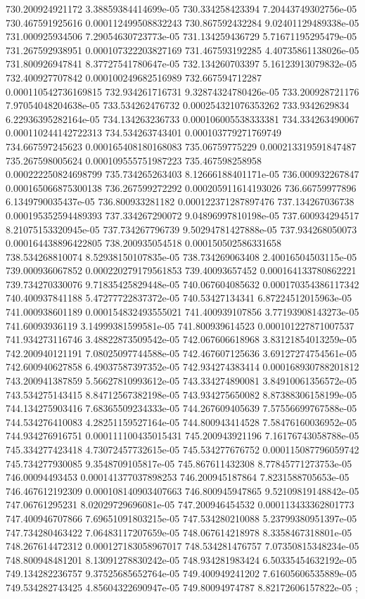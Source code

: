 {730.200924921172 3.38859384414699e-05
730.334258423394 7.20443749302756e-05
730.467591925616 0.000112499508832243
730.867592432284 9.02401129489338e-05
731.000925934506 7.29054630723773e-05
731.134259436729 5.71671195295479e-05
731.267592938951 0.000107322203827169
731.467593192285 4.40735861138026e-05
731.800926947841 8.37727541780647e-05
732.134260703397 5.16123913079832e-05
732.400927707842 0.000100249682516989
732.667594712287 0.000110542736169815
732.934261716731 9.32874324780426e-05
733.200928721176 7.97054048204638e-05
733.534262476732 0.000254321076353262
733.9342629834 6.22936395282164e-05
734.134263236733 0.000106005538333381
734.334263490067 0.000110244142722313
734.534263743401 0.000103779271769749
734.667597245623 0.000165408180168083
735.06759775229 0.000213319591847487
735.267598005624 0.000109555751987223
735.467598258958 0.000222250824698799
735.734265263403 8.12666188401171e-05
736.000932267847 0.000165066875300138
736.267599272292 0.000205911614193026
736.66759977896 6.1349790035437e-05
736.800933281182 0.000122371287897476
737.134267036738 0.000195352594489393
737.334267290072 9.04896997810198e-05
737.600934294517 8.21075153320945e-05
737.734267796739 9.50294781427888e-05
737.934268050073 0.000164438896422805
738.200935054518 0.000150502586331658
738.534268810074 8.52938150107835e-05
738.734269063408 2.40016504503115e-05
739.000936067852 0.000220279179561853
739.40093657452 0.000164133780862221
739.734270330076 9.71835425829448e-05
740.067604085632 0.000170354386117342
740.400937841188 5.47277722837372e-05
740.53427134341 6.87224512015963e-05
741.000938601189 0.000154832493555021
741.400939107856 3.77193908143273e-05
741.60093936119 3.14999381599581e-05
741.800939614523 0.000101227871007537
741.934273116746 3.48822873509542e-05
742.067606618968 3.83121854013259e-05
742.200940121191 7.08025097744588e-05
742.467607125636 3.69127274754561e-05
742.600940627858 6.49037587397352e-05
742.934274383414 0.000168930788201812
743.200941387859 5.56627810993612e-05
743.334274890081 3.84910061356572e-05
743.534275143415 8.84712567382198e-05
743.934275650082 8.87388306158199e-05
744.134275903416 7.68365509234333e-05
744.267609405639 7.57556699767588e-05
744.534276410083 4.28251159527164e-05
744.800943414528 7.58476160036952e-05
744.934276916751 0.000111100435015431
745.200943921196 7.16176743058788e-05
745.334277423418 4.73072457732615e-05
745.534277676752 0.000115087796059742
745.734277930085 9.3548709105817e-05
745.867611432308 8.77845771273753e-05
746.00094493453 0.000141377037898253
746.200945187864 7.8231588705653e-05
746.467612192309 0.000108140903407663
746.800945947865 9.52109819148842e-05
747.06761295231 8.02029729696081e-05
747.200946454532 0.000113433362801773
747.400946707866 7.69651091803215e-05
747.534280210088 5.23799380951397e-05
747.734280463422 7.06483117207659e-05
748.067614218978 8.3358467318801e-05
748.267614472312 0.000127183058967017
748.534281476757 7.07350815348234e-05
748.800948481201 8.13091278830242e-05
748.934281983424 6.50335454632192e-05
749.134282236757 9.37525685652764e-05
749.400949241202 7.61605606535889e-05
749.534282743425 4.85604322690947e-05
749.80094974787 8.82172606157822e-05
};